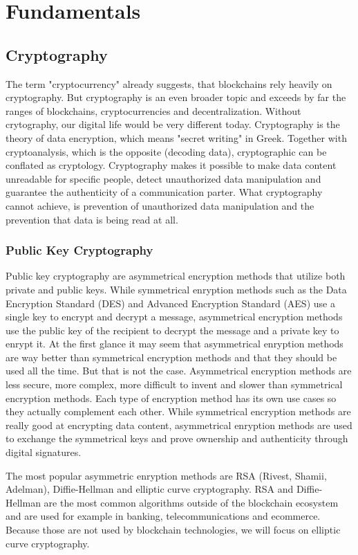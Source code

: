 \chapter{Fundamentals}
\label{cha:Fundamentals}

\section{Cryptography}

The term "cryptocurrency" already suggests, that blockchains rely heavily on cryptography. But cryptography is an even broader topic and exceeds by far the ranges of blockchains, cryptocurrencies and decentralization. Without crytography, our digital life would be very different today. Cryptography is the theory of data encryption, which means "secret writing" in Greek. Together with cryptoanalysis, which is the opposite (decoding data), cryptographic can be conflated as cryptology. Cryptography makes it possible to make data content unreadable for specific people, detect unauthorized data manipulation and guarantee the authenticity of a communication parter. What cryptography cannot achieve, is prevention of unauthorized data manipulation and the prevention that data is being read at all.

\subsection{Public Key Cryptography}
Public key cryptography are asymmetrical encryption methods that utilize both private and public keys. While symmetrical enryption methods such as the Data Encryption Standard (DES) and Advanced Encryption Standard (AES) use a single key to encrypt and decrypt a message, asymmetrical encryption methods use the public key of the recipient to decrypt the message and a private key to enrypt it. At the first glance it may seem that asymmetrical enryption methods are way better than symmetrical encryption methods and that they should be used all the time. But that is not the case. Asymmetrical encryption methods are less secure, more complex, more difficult to invent and slower than symmetrical encryption methods. Each type of encryption method has its own use cases so they actually complement each other. While symmetrical encryption methods are really good at encrypting data content, asymmetrical enryption methods are used to exchange the symmetrical keys and prove ownership and authenticity through digital signatures.

The most popular asymmetric enryption methods are RSA (Rivest, Shamii, Adelman), Diffie-Hellman and elliptic curve cryptography. RSA and Diffie-Hellman are the most common algorithms outside of the blockchain ecosystem and are used for example in banking, telecommunications and ecommerce. Because those are not used by blockchain technologies, we will focus on elliptic curve cryptography.
